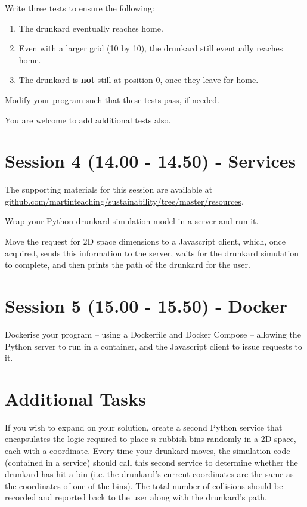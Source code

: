 \documentclass{article}
\begin{document}
Write three tests to ensure the following:

\begin{enumerate}

    \item The drunkard eventually reaches home.

    \item Even with a larger grid (10 by 10), the drunkard still eventually reaches home.

    \item The drunkard is \textbf{not} still at position 0, once they leave for home.

\end{enumerate}

Modify your program such that these tests pass, if needed.

You are welcome to add additional tests also.

\section{Session 4 (14.00 - 14.50) - Services}

The supporting materials for this session are available at \newline
\href{https://github.com/martinteaching/sustainability/tree/master/resources}{github.com/martinteaching/sustainability/tree/master/resources}.

Wrap your Python drunkard simulation model in a server and run it.

Move the request for 2D space dimensions to a Javascript client, which, once acquired, sends this information to the server, waits for the drunkard simulation to complete, and then prints the path of the drunkard for the user.

\section{Session 5 (15.00 - 15.50) - Docker}

Dockerise your program -- using a Dockerfile and Docker Compose -- allowing the Python server to run in a container, and the Javascript client to issue requests to it.

\section{Additional Tasks}

If you wish to expand on your solution, create a second Python service that encapsulates the logic required to place $n$ rubbish bins randomly in a 2D space, each with a coordinate. 
Every time your drunkard moves, the simulation code (contained in a service) should call this second service to determine whether the drunkard has hit a bin (i.e. the drunkard's current coordinates are the same as the coordinates of one of the bins).
The total number of collisions should be recorded and reported back to the user along with the drunkard's path.
\end{document}
